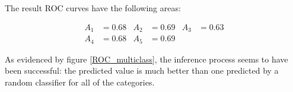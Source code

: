 The result ROC curves have the following areas:

\vspace{-1em}

\begin{align*}
A_1 &= 0.68 & A_2 &= 0.69 & A_3 &= 0.63 \\ 
A_4 &= 0.68 & A_5 &= 0.69
\end{align*}

As evidenced by figure \ref{ROC_multiclass}, the inference process seems to have been successful: the predicted value is much better than one predicted by a random classifier for all of the categories.

